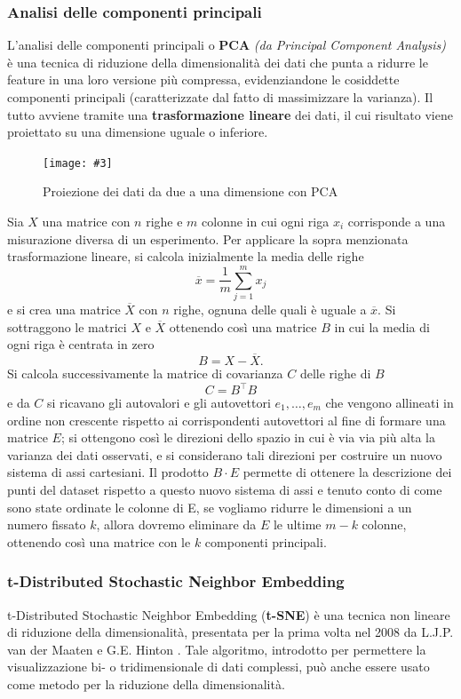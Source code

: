 \documentclass[12pt, twoside, letterpaper]{report}
\newcommand{\img}[4] {
	\begin{figure}
		\centering
		\texttt{[image: \#3]}\\
		\caption{#1}
		\label{fig:#4}
	\end{figure}
}
\begin{document}
				\subsubsection{Analisi delle componenti principali} L'analisi delle componenti principali o \textbf{PCA} \textit{(da Principal Component Analysis)} è una tecnica di riduzione della dimensionalità dei dati che punta a ridurre le feature in una loro versione più compressa, evidenziandone le cosiddette componenti principali (caratterizzate dal fatto di massimizzare la varianza). Il tutto avviene tramite una \textbf{trasformazione lineare} dei dati, il cui risultato viene proiettato su una dimensione uguale o inferiore.
				\img{Proiezione dei dati da due a una dimensione con PCA \cite{bitsofdna}}{0.3}{pca.jpg}{pca}
				Sia $X$ una matrice con $n$ righe e $m$ colonne in cui ogni riga $x_i$ corrisponde a una misurazione diversa di un esperimento.  Per applicare la sopra menzionata trasformazione lineare, si calcola inizialmente la media delle righe 
				$$\overline{x}= \frac{1}{m} \sum_{j=1}^m x_j$$ 
				e si crea una matrice $\overline{X}$ con $n$ righe, ognuna delle quali è uguale a $\overline{x}$. Si sottraggono le matrici $X$ e $\overline{X}$ ottenendo così una matrice $B$ in cui la media di ogni riga è centrata in zero
				$$B = X - \overline{X}.$$
					 Si calcola successivamente la matrice di covarianza $C$ delle righe di $B$
					 $$C = B^\top B$$
					 e da $C$ si ricavano gli autovalori e gli autovettori $e_1, \dots, e_m$ che vengono allineati in ordine non crescente rispetto ai corrispondenti autovettori al fine di formare una matrice $E$; si ottengono così le direzioni dello spazio in cui è via via più alta la varianza dei dati osservati, e si considerano tali direzioni per costruire un nuovo sistema di assi cartesiani. Il prodotto $B \cdot E$ permette di ottenere la descrizione dei punti del dataset rispetto a questo nuovo sistema di assi e tenuto conto di come sono state ordinate le colonne di E, se vogliamo ridurre le dimensioni a un numero fissato $k$, allora dovremo eliminare da $E$ le ultime $m-k$ colonne, ottenendo così una matrice con le $k$ componenti principali.  	 
				
				\subsubsection{t-Distributed Stochastic Neighbor Embedding} t-Distributed Stochastic Neighbor Embedding (\textbf{t-SNE}) è una tecnica non lineare di riduzione della dimensionalità, presentata per la prima volta nel 2008 da  L.J.P. van der Maaten e G.E. Hinton \cite{maaten_hinton}. Tale algoritmo, introdotto per permettere la visualizzazione bi- o tridimensionale di dati complessi, può anche essere usato come metodo per la riduzione della dimensionalità.
				
\end{document}
